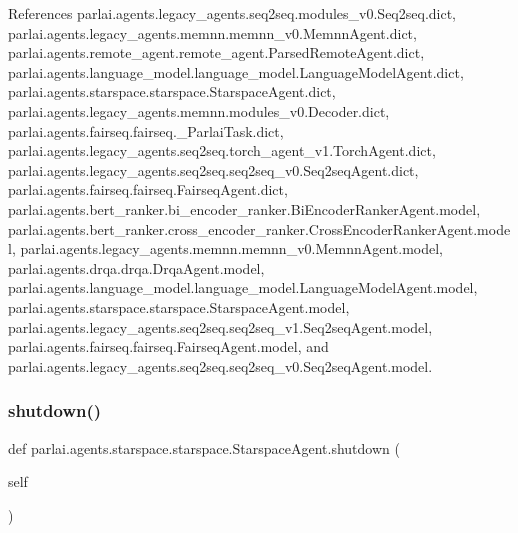 References parlai.\+agents.\+legacy\+\_\+agents.\+seq2seq.\+modules\+\_\+v0.\+Seq2seq.\+dict, parlai.\+agents.\+legacy\+\_\+agents.\+memnn.\+memnn\+\_\+v0.\+Memnn\+Agent.\+dict, parlai.\+agents.\+remote\+\_\+agent.\+remote\+\_\+agent.\+Parsed\+Remote\+Agent.\+dict, parlai.\+agents.\+language\+\_\+model.\+language\+\_\+model.\+Language\+Model\+Agent.\+dict, parlai.\+agents.\+starspace.\+starspace.\+Starspace\+Agent.\+dict, parlai.\+agents.\+legacy\+\_\+agents.\+memnn.\+modules\+\_\+v0.\+Decoder.\+dict, parlai.\+agents.\+fairseq.\+fairseq.\+\_\+\+Parlai\+Task.\+dict, parlai.\+agents.\+legacy\+\_\+agents.\+seq2seq.\+torch\+\_\+agent\+\_\+v1.\+Torch\+Agent.\+dict, parlai.\+agents.\+legacy\+\_\+agents.\+seq2seq.\+seq2seq\+\_\+v0.\+Seq2seq\+Agent.\+dict, parlai.\+agents.\+fairseq.\+fairseq.\+Fairseq\+Agent.\+dict, parlai.\+agents.\+bert\+\_\+ranker.\+bi\+\_\+encoder\+\_\+ranker.\+Bi\+Encoder\+Ranker\+Agent.\+model, parlai.\+agents.\+bert\+\_\+ranker.\+cross\+\_\+encoder\+\_\+ranker.\+Cross\+Encoder\+Ranker\+Agent.\+model, parlai.\+agents.\+legacy\+\_\+agents.\+memnn.\+memnn\+\_\+v0.\+Memnn\+Agent.\+model, parlai.\+agents.\+drqa.\+drqa.\+Drqa\+Agent.\+model, parlai.\+agents.\+language\+\_\+model.\+language\+\_\+model.\+Language\+Model\+Agent.\+model, parlai.\+agents.\+starspace.\+starspace.\+Starspace\+Agent.\+model, parlai.\+agents.\+legacy\+\_\+agents.\+seq2seq.\+seq2seq\+\_\+v1.\+Seq2seq\+Agent.\+model, parlai.\+agents.\+fairseq.\+fairseq.\+Fairseq\+Agent.\+model, and parlai.\+agents.\+legacy\+\_\+agents.\+seq2seq.\+seq2seq\+\_\+v0.\+Seq2seq\+Agent.\+model.

\mbox{\label{classparlai_1_1agents_1_1starspace_1_1starspace_1_1StarspaceAgent_a4016a83cf0ed9ed97c8b94d9eacbcae3}} 
\subsubsection{\texorpdfstring{shutdown()}{shutdown()}}
{\footnotesize\ttfamily def parlai.\+agents.\+starspace.\+starspace.\+Starspace\+Agent.\+shutdown (\begin{DoxyParamCaption}\item[{}]{self }\end{DoxyParamCaption})}



